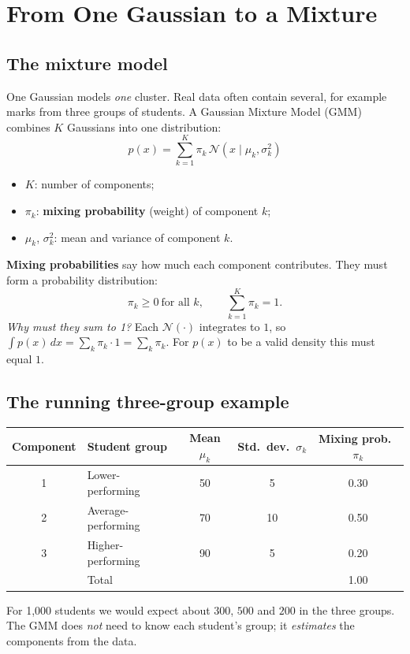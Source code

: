 \documentclass[11pt,a4paper]{article}
\newcommand{\N}{\mathcal{N}}
\begin{document}
\section{From One Gaussian to a Mixture}

\subsection{The mixture model}

One Gaussian models \emph{one} cluster. Real data often contain several, for example marks from three groups of students. A Gaussian Mixture Model (GMM) combines $K$ Gaussians into one distribution:
\[
\boxed{\;p(x)=\sum_{k=1}^K\pi_k\,\N(x\mid\mu_k,\sigma_k^2)\;}
\]
\begin{itemize}[nosep]
\item $K$: number of components;
\item $\pi_k$: \textbf{mixing probability} (weight) of component $k$;
\item $\mu_k$, $\sigma_k^2$: mean and variance of component $k$.
\end{itemize}

\textbf{Mixing probabilities} say how much each component contributes. They must form a probability distribution:
\[
\pi_k\ge0\ \text{for all }k,\qquad\sum_{k=1}^K\pi_k=1.
\]
\emph{Why must they sum to 1?} Each $\N(\cdot)$ integrates to $1$, so $\int p(x)\,dx=\sum_k\pi_k\cdot1=\sum_k\pi_k$. For $p(x)$ to be a valid density this must equal $1$.

\subsection{The running three-group example}

\begin{center}
\begin{tabular}{@{}clccc@{}}
\toprule
Component & Student group & Mean $\mu_k$ & Std.\ dev.\ $\sigma_k$ & Mixing prob.\ $\pi_k$\\
\midrule
1 & Lower-performing & 50 & 5 & 0.30\\
2 & Average-performing & 70 & 10 & 0.50\\
3 & Higher-performing & 90 & 5 & 0.20\\
\midrule
& Total & & & 1.00\\
\bottomrule
\end{tabular}
\end{center}
For 1{,}000 students we would expect about $300$, $500$ and $200$ in the three groups. The GMM does \emph{not} need to know each student's group; it \emph{estimates} the components from the data.
\end{document}
